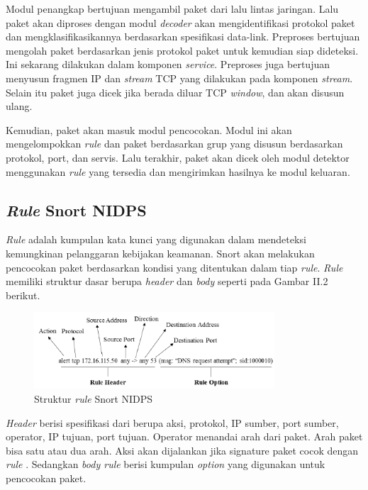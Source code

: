     Modul penangkap bertujuan mengambil paket dari lalu lintas jaringan. Lalu paket akan diproses dengan modul \emph{decoder} akan mengidentifikasi protokol paket dan mengklasifikasikannya berdasarkan spesifikasi data-link. Preproses bertujuan mengolah paket berdasarkan jenis protokol paket untuk kemudian siap dideteksi. Ini sekarang dilakukan dalam komponen \emph{service}. Preproses juga bertujuan menyusun fragmen IP dan \emph{stream} TCP yang dilakukan pada komponen \emph{stream}. Selain itu paket juga dicek jika berada diluar TCP \emph{window}, dan akan disusun ulang. 
    
    Kemudian, paket akan masuk modul pencocokan. Modul ini akan mengelompokkan \emph{rule} dan paket berdasarkan grup yang disusun berdasarkan protokol, port, dan servis. Lalu terakhir, paket akan dicek oleh modul detektor menggunakan \emph{rule} yang tersedia dan mengirimkan hasilnya ke modul keluaran.


  \subsection{\emph{Rule} Snort NIDPS}

  \emph{Rule} adalah kumpulan kata kunci yang digunakan dalam mendeteksi kemungkinan pelanggaran kebijakan keamanan. Snort akan melakukan pencocokan paket berdasarkan kondisi yang ditentukan dalam tiap \emph{rule}. \emph{Rule} memiliki struktur dasar berupa \emph{header} dan \emph{body} seperti pada Gambar II.2 berikut. 
  
      \begin{figure}[htb]
        \centering
        \includegraphics[width=0.8\textwidth]{resources/rule.png}
        \caption[Struktur \emph{rule} Snort NIDPS]{Struktur \emph{rule} Snort NIDPS}
      \end{figure}
  

    \emph{Header} berisi spesifikasi dari berupa aksi, protokol, IP sumber, port sumber, operator, IP tujuan, port tujuan. Operator menandai arah dari paket. Arah paket bisa satu atau dua arah. Aksi akan dijalankan jika signature paket cocok dengan \emph{rule} \citep{5358130}. Sedangkan \emph{body rule} berisi kumpulan \emph{option} yang digunakan untuk pencocokan paket. 

